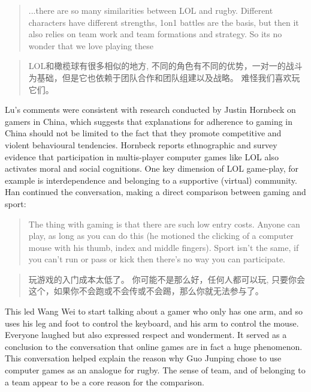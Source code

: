 \begin{CJK}{UTF8}{gbsn}
  \begin{quote}
    ...there are so many similarities between LOL and rugby.  Different characters have different strengths, 1on1 battles are the basis, but then it also relies on team work and team formations and strategy.  So its no wonder that we love playing these
  \end{quote}

  \begin{quote}
    LOL和橄榄球有很多相似的地方, 不同的角色有不同的优势，一对一的战斗为基础，但是它也依赖于团队合作和团队组建以及战略。 难怪我们喜欢玩它们。
  \end{quote}

  Lu's comments were consistent with research conducted by Justin Hornbeck on gamers in China, which suggests that explanations for adherence to gaming in China should not be limited to the fact that they promote competitive and violent behavioural tendencies. Hornbeck reports ethnographic and survey evidence that participation in multis-player computer games like LOL also activates moral and social cognitions. One key dimension of LOL game-play, for example is interdependence and belonging to a supportive (virtual) community. Han continued the conversation, making a direct comparison between gaming and sport:

    \begin{quote}
          The thing with gaming is that there are such low entry costs.  Anyone can play, as long as you can do this (he motioned the clicking of a computer mouse with his thumb, index and middle fingers).  Sport isn’t the same, if you can’t run or pass or kick then there’s no way you can participate.
    \end{quote}

    \begin{quote}
          玩游戏的入门成本太低了。 你可能不是那么好，任何人都可以玩, 只要你会这个，如果你不会跑或不会传或不会踢，那么你就无法参与了。
    \end{quote}

This led Wang Wei to start talking about a gamer who only has one arm, and so uses his leg and foot to control the keyboard, and his arm to control the mouse.  Everyone laughed but also expressed respect and wonderment.  It served as a conclusion to the conversation that online games are in fact a huge phenomenon.  This conversation helped explain the reason why Guo Junping chose to use computer games as an analogue for rugby.  The sense of team, and of belonging to a team appear to be a core reason for the comparison.


\end{CJK}
